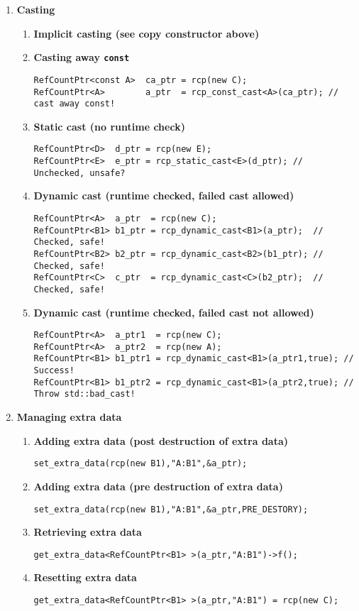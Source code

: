 \documentclass[pdf,ps2pdf,11pt]{SANDreport}
\begin{document}
\begin{enumerate}
\item {\bf Casting}
\label{rcpqs:apdx:qs:casting}
%
\begin{enumerate}
%
\item {\bf Implicit casting (see copy constructor above)}
%
\item {\bf Casting away \texttt{const}}
%
{\small\begin{verbatim}
RefCountPtr<const A>  ca_ptr = rcp(new C);
RefCountPtr<A>        a_ptr  = rcp_const_cast<A>(ca_ptr); // cast away const!
\end{verbatim}}
%
\item {\bf Static cast (no runtime check)}
%
{\small\begin{verbatim}
RefCountPtr<D>  d_ptr = rcp(new E);
RefCountPtr<E>  e_ptr = rcp_static_cast<E>(d_ptr); // Unchecked, unsafe?
\end{verbatim}}
%
\item {\bf Dynamic cast (runtime checked, failed cast allowed)}
%
{\small\begin{verbatim}
RefCountPtr<A>  a_ptr  = rcp(new C);
RefCountPtr<B1> b1_ptr = rcp_dynamic_cast<B1>(a_ptr);  // Checked, safe!
RefCountPtr<B2> b2_ptr = rcp_dynamic_cast<B2>(b1_ptr); // Checked, safe!
RefCountPtr<C>  c_ptr  = rcp_dynamic_cast<C>(b2_ptr);  // Checked, safe!
\end{verbatim}}
%
\item {\bf Dynamic cast (runtime checked, failed cast not allowed)}
%
{\small\begin{verbatim}
RefCountPtr<A>  a_ptr1  = rcp(new C);
RefCountPtr<A>  a_ptr2  = rcp(new A);
RefCountPtr<B1> b1_ptr1 = rcp_dynamic_cast<B1>(a_ptr1,true); // Success!
RefCountPtr<B1> b1_ptr2 = rcp_dynamic_cast<B1>(a_ptr2,true); // Throw std::bad_cast!
\end{verbatim}}
%
\end{enumerate}

\item {\bf Managing extra data}
\label{rcpqs:apdx:qs:extra-data}
%
\begin{enumerate}
%
\item {\bf Adding extra data (post destruction of extra data)}
%
{\small\begin{verbatim}
set_extra_data(rcp(new B1),"A:B1",&a_ptr);
\end{verbatim}}
%
\item {\bf Adding extra data (pre destruction of extra data)}
%
{\small\begin{verbatim}
set_extra_data(rcp(new B1),"A:B1",&a_ptr,PRE_DESTORY);
\end{verbatim}}
%
\item {\bf Retrieving extra data}
%
{\small\begin{verbatim}
get_extra_data<RefCountPtr<B1> >(a_ptr,"A:B1")->f();
\end{verbatim}}
%
\item {\bf Resetting extra data}
%
{\small\begin{verbatim}
get_extra_data<RefCountPtr<B1> >(a_ptr,"A:B1") = rcp(new C);
\end{verbatim}}
%
\end{enumerate}

\end{enumerate}
\end{document}
